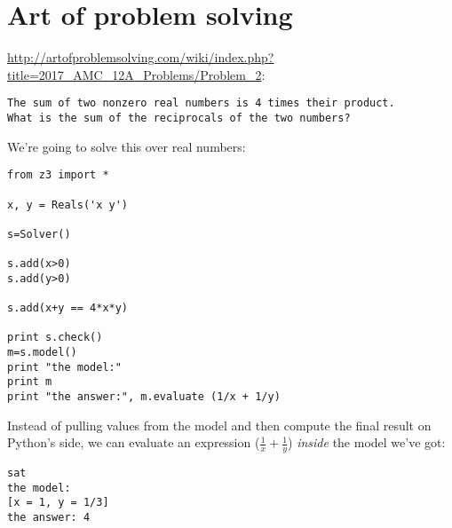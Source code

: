 \section{Art of problem solving}

\url{http://artofproblemsolving.com/wiki/index.php?title=2017_AMC_12A_Problems/Problem_2}:

\begin{lstlisting}
The sum of two nonzero real numbers is 4 times their product.
What is the sum of the reciprocals of the two numbers? 
\end{lstlisting}

We're going to solve this over real numbers:

\begin{lstlisting}[style=custompy]
from z3 import *

x, y = Reals('x y')

s=Solver()

s.add(x>0)
s.add(y>0)

s.add(x+y == 4*x*y)

print s.check()
m=s.model()
print "the model:"
print m
print "the answer:", m.evaluate (1/x + 1/y)
\end{lstlisting}

Instead of pulling values from the model and then compute the final result on Python's side, we can evaluate
an expression ($\frac{1}{x} + \frac{1}{y}$) \emph{inside} the model we've got:

\begin{lstlisting}
sat
the model:
[x = 1, y = 1/3]
the answer: 4
\end{lstlisting}

